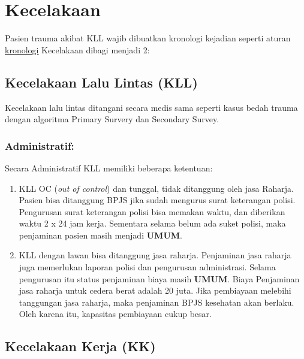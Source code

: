 \documentclass[
]{book}
\begin{document}
\hypertarget{kecelakaan}{%
\section{Kecelakaan}\label{kecelakaan}}

Pasien trauma akibat KLL wajib dibuatkan kronologi kejadian seperti aturan \protect\hyperlink{kronologi}{kronologi}
Kecelakaan dibagi menjadi 2:

\hypertarget{kecelakaan-lalu-lintas-kll}{%
\subsection{Kecelakaan Lalu Lintas (KLL)}\label{kecelakaan-lalu-lintas-kll}}

Kecelakaan lalu lintas ditangani secara medis sama seperti kasus bedah trauma dengan algoritma Primary Survery dan Secondary Survey.

\hypertarget{administratif}{%
\subsubsection{Administratif:}\label{administratif}}

Secara Administratif KLL memiliki beberapa ketentuan:

\begin{enumerate}
\def\labelenumi{\arabic{enumi}.}
\item
  KLL OC (\emph{out of control}) dan tunggal, tidak ditanggung oleh jasa Raharja. Pasien bisa ditanggung BPJS jika sudah mengurus surat keterangan polisi. Pengurusan surat keterangan polisi bisa memakan waktu, dan diberikan waktu 2 x 24 jam kerja. Sementara selama belum ada suket polisi, maka penjaminan pasien masih menjadi \textbf{UMUM}.
\item
  KLL dengan lawan bisa ditanggung jasa raharja. Penjaminan jasa raharja juga memerlukan laporan polisi dan pengurusan administrasi. Selama pengurusan itu status penjaminan biaya masih \textbf{UMUM}. Biaya Penjaminan jasa raharja untuk cedera berat adalah 20 juta. Jika pembiayaan melebihi tanggungan jasa raharja, maka penjaminan BPJS kesehatan akan berlaku. Oleh karena itu, kapasitas pembiayaan cukup besar.
\end{enumerate}

\hypertarget{kecelakaan-kerja-kk}{%
\subsection{Kecelakaan Kerja (KK)}\label{kecelakaan-kerja-kk}}
\end{document}

